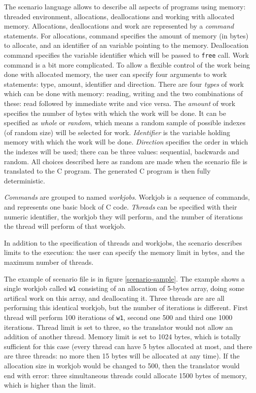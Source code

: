 The scenario language allows to describe all aspects of programs using memory:
threaded environment, allocations, deallocations and working with allocated
memory. Allocations, deallocations and work are represented by a {\em command}
statements. For allocations, command specifies the amount of memory (in bytes)
to allocate, and an identifier of an variable pointing to the memory.
Deallocation command specifies the variable identifier which will be passed to
{\tt free} call. Work command is a bit more complicated. To allow a flexible
control of the work being done with allocated memory, the user can specify four
arguments to work statements: type, amount, identifier and direction. There are
four {\em types} of work which can be done with memory: reading, writing and the
two combinations of these: read followed by immediate write and vice versa. The
{\em amount} of work specifies the number of bytes with which the work will be
done. It can be specified as {\em whole} or {\em random}, which means a random
sample of possible indexes (of random size) will be selected for work. {\em
Identifier} is the variable holding memory with which the work will be done.
{\em Direction} specifies the order in which the indexes will be used; there can
be three values: sequential, backwards and random.
All choices described here as random are made when the scenario file is
translated to the C program. The generated C program is then fully
deterministic.

{\em Commands} are grouped to named {\em workjobs}. Workjob is a sequence of
commands, and represents one basic block of C code. {\em Threads} can be
specified with their numeric identifier, the workjob they will perform, and the
number of iterations the thread will perform of that workjob.

In addition to the specification of threads and workjobs, the scenario describes
limits to the execution: the user can specify the memory limit in bytes, and the
maximum number of threads.

The example of scenario file is in figure \ref{scenario-sample}. The example
shows a single workjob called {\tt w1} consisting of an allocation of 5-bytes
array, doing some artifical work on this array, and deallocating it. Three
threads are are all performing this identical workjob, but the number of
iterations is different. First thread will perform 100 iterations of {\tt w1},
second one 500 and third one 1000 iterations. Thread limit is set to three, so
the translator would not allow an addition of another thread. Memory limit is
set to 1024 bytes, which is totally sufficient for this case (every thread can
have 5 bytes allocated at most, and there are three threads: no more then
15 bytes will be allocated at any time). If the allocation size in workjob would
be changed to 500, then the translator would end with error: three simultaneous
threads could allocate 1500 bytes of memory, which is higher than the limit.

